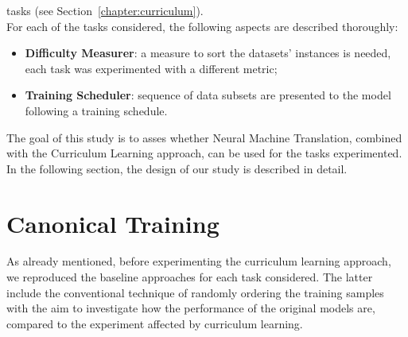 tasks (see Section~\ref{chapter:curriculum}).\\
For each of the tasks considered, the following aspects are described thoroughly:
\begin{itemize}
    \item \textbf{Difficulty Measurer}: a measure to sort the datasets' instances is needed, each task was experimented with a different metric; 
    \item \textbf{Training Scheduler}: sequence of data subsets are presented to the model following a training schedule.
\end{itemize}
The goal of this study is to asses whether Neural Machine Translation, combined with the Curriculum Learning approach, 
can be used for the tasks experimented. In the following section, the design of our study is described in detail.


 

\section{Canonical Training}\label{chapter:canonical}
As already mentioned, before experimenting the curriculum learning approach, we reproduced the baseline approaches for each task considered.
The latter include the conventional technique of randomly ordering the training samples with the aim to investigate how the performance 
of the original models are, compared to the experiment affected by curriculum learning.
